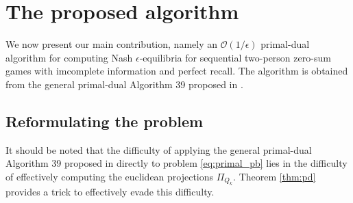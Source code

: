\documentclass{article} %
\begin{document}
\section{The proposed algorithm}
\label{sec:algo}
We now present our main contribution, namely an $\mathcal{O}(1/\epsilon)$ primal-dual algorithm for computing Nash $\epsilon$-equilibria for sequential two-person zero-sum games with imcomplete information and perfect recall. The algorithm is obtained from the general primal-dual Algorithm 39 proposed in \cite{chambolle2010}.

\subsection{Reformulating the problem}
It should be noted that the difficulty of applying the general primal-dual Algorithm 39 proposed in \cite{chambolle2010} directly to problem \eqref{eq:primal_pb} lies in the difficulty of effectively computing the euclidean projections $\Pi_{Q_k}$. Theorem \ref{thm:pd} provides a trick to effectively evade this difficulty.
\end{document}
